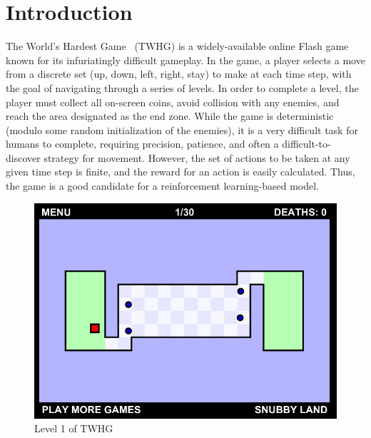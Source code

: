 \documentclass[12pt]{article}
\begin{document}
\section{Introduction}


The World's Hardest Game~\cite{game} (TWHG) is a widely-available online Flash game known for its infuriatingly difficult gameplay. In the game, a player selects a move from a discrete set (up, down, left, right, stay) to make at each time step, with the goal of navigating through a series of levels. In order to complete a level, the player must collect all on-screen coins, avoid collision with any enemies, and reach the area designated as the end zone. While the game is deterministic (modulo some random initialization of the enemies), it is a very difficult task for humans to complete, requiring precision, patience, and often a difficult-to-discover strategy for movement. However, the set of actions to be taken at any given time step is finite, and the reward for an action is easily calculated. Thus, the game is a good candidate for a reinforcement learning-based model.

\begin{figure}[H]
  \includegraphics[width=1\textwidth]{report/hardest_game}
  \centering
  \caption{Level 1 of TWHG}
  \label{fig:twhg}
\end{figure}
\end{document}
